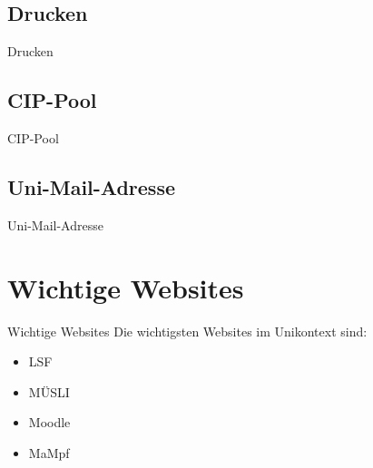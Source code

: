 
\subsection{Drucken}
\begin{frame}{Drucken}
\end{frame}


\subsection{CIP-Pool}
\begin{frame}{CIP-Pool}
\end{frame}


\subsection{Uni-Mail-Adresse}
\begin{frame}{Uni-Mail-Adresse}
\end{frame}


\section{Wichtige Websites}
\begin{frame}{Wichtige Websites}
    Die wichtigsten Websites im Unikontext sind:
    \begin{itemize}
        \item{LSF}
        \item{MÜSLI}
        \item{Moodle}
        \item{MaMpf}
    \end{itemize}
\end{frame}


